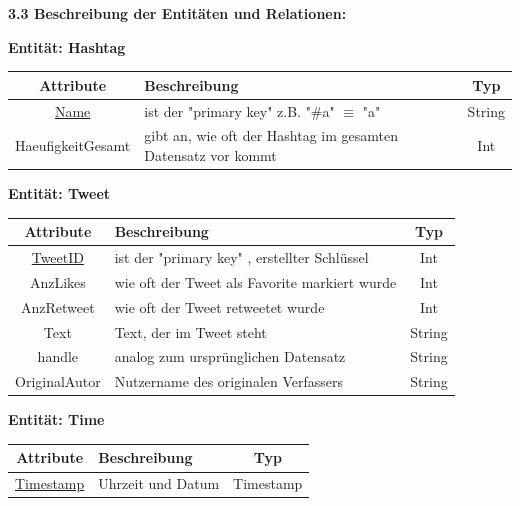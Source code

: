 \documentclass[a4paper ,8pt,x11names]{article}
\begin{document}
\begin{flushleft}
\textbf{3.3 Beschreibung der Entitäten und Relationen:}\\

\begin{table}[!htb] 
\begin{center}
\textbf{Entität: Hashtag}
\end{center}
 \begin{tabular}{|c|p{8cm}|c|}\hline
   \textbf{Attribute} & \textbf{Beschreibung} & \textbf{Typ} \\ \hline \hline
   \underline{Name} & ist der "primary key" z.B. "\#a" $\equiv$ "a"  & String \\ \hline    
   HaeufigkeitGesamt & gibt an, wie oft der Hashtag im gesamten Datensatz vor kommt  & Int \\ \hline
 \end{tabular}
\end{table}

\begin{table}[!htb] 
\begin{center}
\textbf{Entität: Tweet}
\end{center}
 \begin{tabular}{|c|p{8cm}|c|}\hline
   \textbf{Attribute} & \textbf{Beschreibung} & \textbf{Typ} \\ \hline \hline
   \underline{TweetID} & ist der "primary key" , erstellter Schlüssel  & Int \\ \hline    
   AnzLikes & wie oft der Tweet als Favorite markiert wurde  & Int \\ \hline
   AnzRetweet & wie oft der Tweet retweetet wurde  & Int \\ \hline
   Text & Text, der im Tweet steht & String \\ \hline
   handle & analog zum ursprünglichen Datensatz & String \\ \hline
   OriginalAutor & Nutzername des originalen Verfassers & String \\ \hline
 \end{tabular}
\end{table}

\begin{table}[!htb] 
\begin{center}
\textbf{Entität: Time}
\end{center}
 \begin{tabular}{|c|p{8cm}|c|}\hline
   \textbf{Attribute} & \textbf{Beschreibung} & \textbf{Typ} \\ \hline \hline
   \underline{Timestamp} & Uhrzeit und Datum  & Timestamp \\ \hline    
 \end{tabular}
\end{table}


\end{flushleft}
\end{document}
